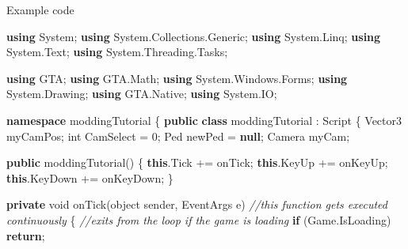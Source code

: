 \documentclass[
  openany]{book}
\newenvironment{Shaded}{\begin{snugshade}}{\end{snugshade}}
\newcommand{\CommentTok}[1]{\textcolor[rgb]{0.56,0.35,0.01}{\textit{#1}}}
\newcommand{\DataTypeTok}[1]{\textcolor[rgb]{0.13,0.29,0.53}{#1}}
\newcommand{\DecValTok}[1]{\textcolor[rgb]{0.00,0.00,0.81}{#1}}
\newcommand{\FunctionTok}[1]{\textcolor[rgb]{0.00,0.00,0.00}{#1}}
\newcommand{\KeywordTok}[1]{\textcolor[rgb]{0.13,0.29,0.53}{\textbf{#1}}}
\newcommand{\NormalTok}[1]{#1}
\begin{document}
Example code

\begin{Shaded}
\begin{Highlighting}[]
\KeywordTok{using}\NormalTok{ System;}
\KeywordTok{using}\NormalTok{ System.}\FunctionTok{Collections}\NormalTok{.}\FunctionTok{Generic}\NormalTok{;}
\KeywordTok{using}\NormalTok{ System.}\FunctionTok{Linq}\NormalTok{;}
\KeywordTok{using}\NormalTok{ System.}\FunctionTok{Text}\NormalTok{;}
\KeywordTok{using}\NormalTok{ System.}\FunctionTok{Threading}\NormalTok{.}\FunctionTok{Tasks}\NormalTok{;}

\KeywordTok{using}\NormalTok{ GTA;}
\KeywordTok{using}\NormalTok{ GTA.}\FunctionTok{Math}\NormalTok{;}
\KeywordTok{using}\NormalTok{ System.}\FunctionTok{Windows}\NormalTok{.}\FunctionTok{Forms}\NormalTok{;}
\KeywordTok{using}\NormalTok{ System.}\FunctionTok{Drawing}\NormalTok{;}
\KeywordTok{using}\NormalTok{ GTA.}\FunctionTok{Native}\NormalTok{;}
\KeywordTok{using}\NormalTok{ System.}\FunctionTok{IO}\NormalTok{;}


\KeywordTok{namespace}\NormalTok{ moddingTutorial}
\NormalTok{\{}
    \KeywordTok{public} \KeywordTok{class}\NormalTok{ moddingTutorial : Script}
\NormalTok{    \{}
\NormalTok{        Vector3 myCamPos;}
        \DataTypeTok{int}\NormalTok{ CamSelect = }\DecValTok{0}\NormalTok{;}
\NormalTok{        Ped newPed = }\KeywordTok{null}\NormalTok{;}
\NormalTok{        Camera myCam;}

        \KeywordTok{public} \FunctionTok{moddingTutorial}\NormalTok{()}
\NormalTok{        \{}
            \KeywordTok{this}\NormalTok{.}\FunctionTok{Tick}\NormalTok{ += onTick;}
            \KeywordTok{this}\NormalTok{.}\FunctionTok{KeyUp}\NormalTok{ += onKeyUp;}
            \KeywordTok{this}\NormalTok{.}\FunctionTok{KeyDown}\NormalTok{ += onKeyDown;}
\NormalTok{        \}}

        \KeywordTok{private} \DataTypeTok{void} \FunctionTok{onTick}\NormalTok{(}\DataTypeTok{object}\NormalTok{ sender, EventArgs e) }\CommentTok{//this function gets executed continuously }
\NormalTok{        \{}
            \CommentTok{//exits from the loop if the game is loading}
            \KeywordTok{if}\NormalTok{ (Game.}\FunctionTok{IsLoading}\NormalTok{) }\KeywordTok{return}\NormalTok{;}
            

\end{Highlighting}
\end{Shaded}
\end{document}
